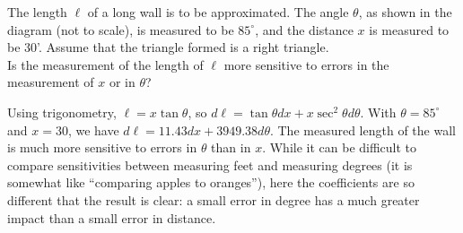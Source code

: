 {The length $\ell$ of a long wall is to be approximated. The angle $\theta$, as shown in the diagram (not to scale), is measured to be $85^\circ$, and the distance $x$ is measured to be 30'. Assume that the triangle formed is a right triangle.\\

Is the measurement of the length of $\ell$ more sensitive to errors in the measurement of $x$ or in $\theta$?

\begin{minipage}{\linewidth}
\centering
{}
\end{minipage}
}
{Using trigonometry, $\ell = x\tan\theta$, so $d\ell = \tan\theta dx + x\sec^2\theta d\theta$. With $\theta = 85^\circ$ and $x=30$, we have $d\ell = 11.43dx+3949.38d\theta$. The measured length of the wall is much more sensitive to errors in $\theta$ than in $x$. While it can be difficult to compare sensitivities between measuring feet and measuring degrees (it is somewhat like ``comparing apples to oranges''), here the coefficients are so different that the result is clear: a small error in degree has a much greater impact than a small error in distance.
}